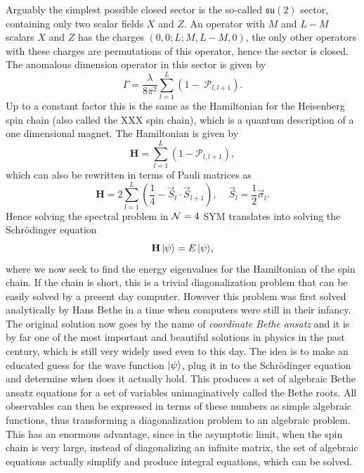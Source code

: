 Arguably the simplest possible closed sector is the so-called $\mathfrak{su}(2)$ sector, containing only two scalar fields $X$ and $Z$. 
An operator with $M$ and $L-M$ scalars $X$ and $Z$ has the charges $(0, 0; L; M, L-M, 0)$, the only other operators with these charges are permutations of this operator, hence the sector is closed. 
The anomalous dimension operator in this sector is given by
\begin{equation}
	\Gamma = \frac{\lambda}{8\pi^2}\sum_{l=1}^L \left(1 - \; \mathcal{P}_{l,l+1} \right).
\end{equation}
Up to a constant factor this is the same as the Hamiltonian for the Heisenberg spin chain (also called the XXX spin chain), which is a quantum description of a one dimensional magnet. 
The Hamiltonian is given by
\begin{equation}
	\mathbf{H} = \sum_{l=1}^L \left(1 - \mathcal{P}_{l,l+1} \right),
\end{equation}
which can also be rewritten in terms of Pauli matrices as
\begin{equation}
	\mathbf{H} = 2 \sum_{l=1}^L \left( \frac{1}{4} - \vec{S}_l \cdot \vec{S}_{l+1} \right), \;\;\;\; \vec{S}_l = \frac{1}{2} \vec{\sigma}_l.
\end{equation}
Hence solving the spectral problem in $\mathcal{N}=4$ SYM translates into solving the Schr\"{o}dinger equation
\begin{equation}
	\mathbf{H} \, |\psi\rangle = E \, |\psi\rangle,
	\label{eq:Schrodinger}
\end{equation}
where we now seek to find the energy eigenvalues for the Hamiltonian of the spin chain. 
If the chain is short, this is a trivial diagonalization problem that can be easily solved by a present day computer. 
However this problem was first solved analytically by Hans Bethe in a time when computers were still in their infancy. 
The original solution now goes by the name of \emph{coordinate Bethe ansatz} and it is by far one of the most important and beautiful solutions in physics in the past century, which is still very widely used even to this day. 
The idea is to make an educated guess for the wave function $|\psi\rangle$, plug it in to the Schr\"{o}dinger equation and determine when does it actually hold. 
This produces a set of algebraic Bethe ansatz equations for a set of variables unimaginatively called the Bethe roots. 
All observables can then be expressed in terms of these numbers as simple algebraic functions, thus transforming a diagonalization problem to an algebraic problem. 
This has an enormous advantage, since in the asymptotic limit, when the spin chain is very large, instead of diagonalizing an infinite matrix, the set of algebraic equations actually simplify and produce integral equations, which can be solved.

